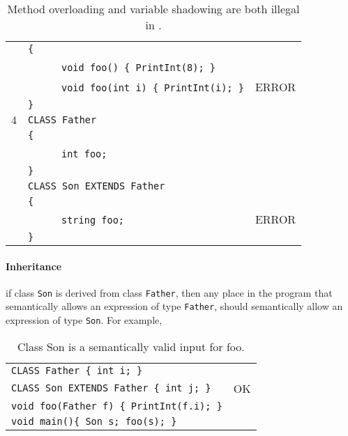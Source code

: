 \documentclass{article}
\begin{document}
\begin{table}[h]
\begin{tabular}{|l|l|l|}
     & \verb"{"                                       &       \\
     & ~ ~ ~ ~\verb"void foo() { PrintInt(8); }"      &       \\
     & ~ ~ ~ ~\verb"void foo(int i) { PrintInt(i); }" & ERROR \\
     & \verb"}"                                       &       \\
\hline
 $4$ & \verb"CLASS Father"             &       \\
     & \verb"{"                        &       \\
     & ~ ~ ~ ~\verb"int foo;"          &       \\
     & \verb"}"                        &       \\
     & \verb"CLASS Son EXTENDS Father" &       \\
     & \verb"{"                        &       \\
     & ~ ~ ~ ~\verb"string foo;"       & ERROR \\
     & \verb"}"                        &       \\
\hline
\end{tabular}
\caption{Method overloading and variable shadowing are both illegal in \plname.
\label{Table_Code_Examples_Overload_Override}}
\end{table}
\newpage
\paragraph{Inheritance} if class \verb"Son" is derived from class \verb"Father",
then any place in the program that semantically allows an expression of type \verb"Father",
should semantically allow an expression of type \verb"Son".
For example,
\begin{table}[h]
\centering
\begin{tabular}{ | l  | l | }
\hline
\verb"CLASS Father { int i; }"               &    \\
\verb"CLASS Son EXTENDS Father { int j; }"   & OK \\
\verb"void foo(Father f) { PrintInt(f.i); }" &    \\
\verb"void main(){ Son s; foo(s); }"         &    \\
\hline
\end{tabular}
\caption{Class Son is a semantically valid input for foo.
\label{Table_Code_Examples_Son_Class_Instead_Of_Father_Class}}
\end{table}
\end{document}
